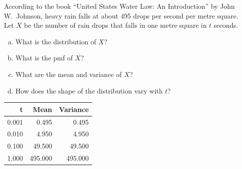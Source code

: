 \begin{frame}
  \begin{block}{\example}
    According to the book ``United States Water Law: An Introduction'' by John W.~Johnson, heavy rain falls at about 495 drops per second per metre square. Let $X$ be the number of rain drops that falls in one metre square in $t$ seconds.
    \begin{enumerate}[a)]
    \item What is the distribution of $X$?
    \item What is the pmf of $X$?
    \item What are the mean and variance of $X$?
    \item How does the shape of the distribution vary with $t$?
    \end{enumerate}
  \end{block}
\end{frame}




\begin{frame}
  \begin{block}{\examplectd}
\begin{table}[ht]
\centering
\begin{tabular}{rrr}
  \hline
t & Mean & Variance \\ 
  \hline
0.001 & 0.495 & 0.495 \\ 
  0.010 & 4.950 & 4.950 \\ 
  0.100 & 49.500 & 49.500 \\ 
  1.000 & 495.000 & 495.000 \\ 
   \hline
\end{tabular}
\end{table}

  \end{block}
\end{frame}

